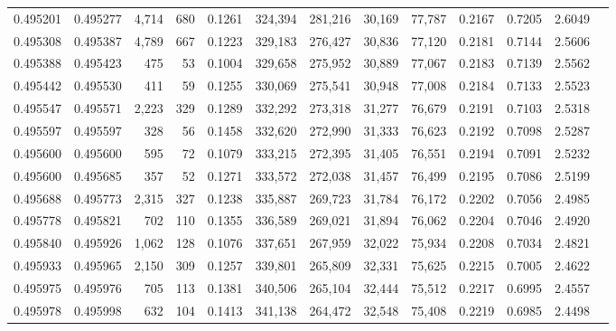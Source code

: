 \begin{tabular}{rrrrrrrrrrrrr}
0.495201 & 0.495277 & 4,714 &   680 &                                     0.1261 & 324,394 & 281,216 &  30,169 &  77,787 & 0.2167 & 0.7205 & 2.6049 \\
0.495308 & 0.495387 & 4,789 &   667 &                                     0.1223 & 329,183 & 276,427 &  30,836 &  77,120 & 0.2181 & 0.7144 & 2.5606 \\
0.495388 & 0.495423 &   475 &    53 &                                     0.1004 & 329,658 & 275,952 &  30,889 &  77,067 & 0.2183 & 0.7139 & 2.5562 \\
0.495442 & 0.495530 &   411 &    59 &                                     0.1255 & 330,069 & 275,541 &  30,948 &  77,008 & 0.2184 & 0.7133 & 2.5523 \\
0.495547 & 0.495571 & 2,223 &   329 &                                     0.1289 & 332,292 & 273,318 &  31,277 &  76,679 & 0.2191 & 0.7103 & 2.5318 \\
0.495597 & 0.495597 &   328 &    56 &                                     0.1458 & 332,620 & 272,990 &  31,333 &  76,623 & 0.2192 & 0.7098 & 2.5287 \\
0.495600 & 0.495600 &   595 &    72 &                                     0.1079 & 333,215 & 272,395 &  31,405 &  76,551 & 0.2194 & 0.7091 & 2.5232 \\
0.495600 & 0.495685 &   357 &    52 &                                     0.1271 & 333,572 & 272,038 &  31,457 &  76,499 & 0.2195 & 0.7086 & 2.5199 \\
0.495688 & 0.495773 & 2,315 &   327 &                                     0.1238 & 335,887 & 269,723 &  31,784 &  76,172 & 0.2202 & 0.7056 & 2.4985 \\
0.495778 & 0.495821 &   702 &   110 &                                     0.1355 & 336,589 & 269,021 &  31,894 &  76,062 & 0.2204 & 0.7046 & 2.4920 \\
0.495840 & 0.495926 & 1,062 &   128 &                                     0.1076 & 337,651 & 267,959 &  32,022 &  75,934 & 0.2208 & 0.7034 & 2.4821 \\
0.495933 & 0.495965 & 2,150 &   309 &                                     0.1257 & 339,801 & 265,809 &  32,331 &  75,625 & 0.2215 & 0.7005 & 2.4622 \\
0.495975 & 0.495976 &   705 &   113 &                                     0.1381 & 340,506 & 265,104 &  32,444 &  75,512 & 0.2217 & 0.6995 & 2.4557 \\
0.495978 & 0.495998 &   632 &   104 &                                     0.1413 & 341,138 & 264,472 &  32,548 &  75,408 & 0.2219 & 0.6985 & 2.4498 \\

\end{tabular}
